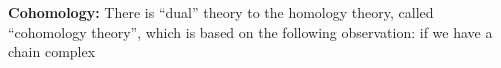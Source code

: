 \def\ccy{\Cyan}		  %
\def\cpb{\ProcessBlue}	  %
\def\csb{\SkyBlue}	  %
\def\ctu{\Turquoise}	  %
\def\ctb{\TealBlue}	  %
\def\caq{\Aquamarine}	  %
\def\cbg{\BlueGreen}	  %
\def\cem{\Emerald}	  %
\def\csg{\SeaGreen}	  %
\def\cgg{\Green}	  %
\def\cfg{\ForestGreen}	  %
\def\cpg{\PineGreen}	  %
\def\clg{\LimeGreen}	  %
\def\cyg{\YellowGreen}	  %
\def\cspg{\SpringGreen}	  %
\def\cog{\OliveGreen}	  %
\def\pars{\RawSienna}	  %
\def\cse{\Sepia}		  %
\def\cbr{\Brown}		  %
\def\cta{\Tan}		  %
\def\cgr{\Gray}		  %
\def\cbl{\Black}		  %
\def\cwh{\White}		  %


\loadmsbm



\def\ctln{\centerline}
\def\u{\underbar}
\def\ssk{\smallskip}
\def\msk{\medskip}
\def\bsk{\bigskip}
\def\hsk{\hskip.1in}
\def\hhsk{\hskip.2in}
\def\dsl{\displaystyle}
\def\hskp{\hskip1.5in}

\def\lra{$\Leftrightarrow$ }
\def\ra{\rightarrow}
\def\mpto{\logmapsto}
\def\pu{\pi_1}
\def\mpu{$\pi_1$}
\def\sig{\Sigma}
\def\msig{$\Sigma$}
\def\ep{\epsilon}
\def\sset{\subseteq}
\def\del{\partial}
\def\inv{^{-1}}
\def\wtl{\widetilde}
\def\del{\partial}
\def\delp{\partial^\prime}
\def\delpp{\partial^{\prime\prime}}
\def\sgn{{\roman{sgn}}}
\def\wtih{\widetilde{H}}
\def\bbz{{\Bbb Z}}
\def\bbr{{\Bbb R}}
\def\bbq{{\Bbb Q}}
\def\bbc{{\Bbb C}}
\def\hdsk{\hskip.7in}
\def\hdskb{\hskip.9in}
\def\hdskc{\hskip1.1in}
\def\hdskd{\hskip1.3in}
\def\Hom{\text{Hom}}
\def\Ext{\text{Ext}}
\def\larr{\leftarrow}



{\bf Cohomology:} There is ``dual'' theory to the homology theory, called
``cohomology theory'', which is based on the following observation: if we
have a chain complex

